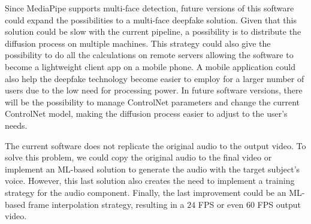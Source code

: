 \documentclass[preprint]{elsarticle}
\begin{document}
Since MediaPipe supports multi-face detection, future versions of this software could expand the possibilities to a multi-face deepfake solution. Given that this solution could be slow with the current pipeline, a possibility is to distribute the diffusion process on multiple machines. This strategy could also give the possibility to do all the calculations on remote servers allowing the software to become a lightweight client app on a mobile phone. A mobile application could also help the deepfake technology become easier to employ for a larger number of users due to the low need for processing power. In future software versions, there will be the possibility to manage ControlNet parameters and change the current ControlNet model, making the diffusion process easier to adjust to the user's needs.

The current software does not replicate the original audio to the output video. To solve this problem, we could copy the original audio to the final video or implement an ML-based solution to generate the audio with the target subject's voice. However, this last solution also creates the need to implement a training strategy for the audio component. Finally, the last improvement could be an ML-based frame interpolation strategy, resulting in a $24$ FPS or even $60$ FPS output video.



  

\end{document}
